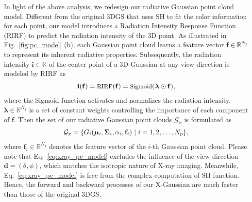 \documentclass[runningheads]{llncs}
\begin{document}
In light of the above analysis, we redesign our radiative Gaussian point cloud model. Different from the original 3DGS that uses SH to fit the color information for each point,  our model introduces a Radiation Intensity Response Function (RIRF) to predict the radiation intensity of the 3D point. As illustrated in Fig.~\ref{fig:pc_model} (b), each Gaussian point cloud learns a feature vector $\mathbf{f} \in \mathbb{R}^{N_f}$ to represent its inherent radiative properties. Subsequently, the radiation intensity $\mathbf{i} \in \mathbb{R}$ of the center point of a 3D Gaussian at any view direction is modeled by RIRF as
\vspace{-1.3mm}
\begin{equation}
	\small
	\mathbf{i}(\mathbf{f}) = \text{RIRF}(\mathbf{f}) = \text{Sigmoid}(\bm{\lambda} \odot \mathbf{f}),
	\label{eq:xray_pc_model}
\vspace{-1.7mm}
\end{equation}
where the Sigmoid function activates and normalizes the radiation intensity. $\bm{\lambda} \in \mathbb{R}^{N_f}$ is a set of constant weights controlling the importance of each component of $\mathbf{f}$. Then the set of our radiative Gaussian point clouds $\mathcal{G}_x$ is formulated as
\vspace{-0.9mm}
\begin{equation}
\small
    \mathcal{G}_x = \{G_i(\bm{\mu}_i, \mathbf{\Sigma}_i, \alpha_i, \mathbf{f}_i)~|~i = 1, 2, \dots, N_p\},
\vspace{-1.1mm}
\end{equation}
where $\mathbf{f}_i \in \mathbb{R}^{N_f}$ denotes the feature vector of the $i$-th Gaussian point cloud. Please note that Eq.~\eqref{eq:xray_pc_model} excludes the influence of the view direction $\mathbf{d} = (\theta, \phi)$, which matches the isotropic nature of X-ray imaging. Meanwhile, Eq.~\eqref{eq:xray_pc_model} is free from the complex computation of SH function.
Hence, the forward and backward processes of our X-Gaussian are much faster than those of the original 3DGS. 

\vspace{-3mm}
\end{document}
